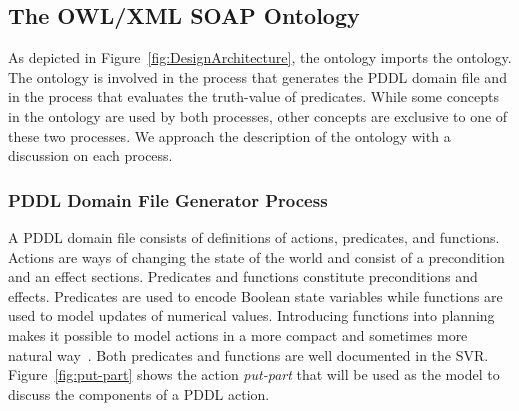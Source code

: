 \subsection{The OWL/XML SOAP Ontology}\label{owlsoap}
As depicted in Figure~\ref{fig:DesignArchitecture}, the  ontology imports the  ontology. The  ontology is involved in the process that generates the PDDL domain file and in the process that evaluates the truth-value of predicates. While some concepts in the  ontology are used by both processes, other concepts are exclusive to one of these two processes. We approach the description of the  ontology with a discussion on each process.

\subsubsection{PDDL Domain File Generator Process}\label{sss:domainfile}
A PDDL domain file consists of definitions of actions, predicates, and functions. Actions are ways of changing the state of the world and consist of a precondition and an effect sections. Predicates and functions constitute preconditions and effects. Predicates are used to encode Boolean state variables while functions are used to model updates of numerical values. Introducing functions into planning makes it possible to model actions in a more compact and sometimes more natural way~\cite{FOX.JAIR.2003}. Both predicates and functions are well documented in the SVR. Figure~\ref{fig:put-part} shows the action \textsl{put-part} that will be used as the model to discuss the components of a PDDL action.

